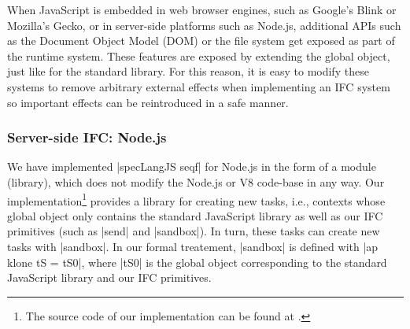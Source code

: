When JavaScript is embedded in web browser engines, such as Google's
Blink or Mozilla's Gecko, or in server-side platforms such as Node.js,
additional APIs such as the Document Object Model (DOM) or the file
system get exposed as part of the runtime system.
These features are exposed by extending the global object, just like
for the standard library.  For this reason, it is easy to modify
these systems to remove arbitrary external effects when implementing
an IFC system so important effects can be reintroduced in a safe manner.


\subsubsection{Server-side IFC: Node.js}

We have implemented |specLangJS seqf| for Node.js in the form of a module
(library), which does not modify the Node.js or V8 code-base in any
way.
%
Our implementation\footnote{The source code of our implementation can be found at
  \codelink{}.} provides a library for creating new tasks, i.e.,
contexts whose global object only contains the standard JavaScript
library as well as our IFC primitives (such as |send| and |sandbox|).
%
In turn, these tasks can create new tasks with |sandbox|.
%
In our formal treatement, |sandbox| is defined with |ap klone tS = tS0|,
where |tS0| is the global object corresponding to the standard
JavaScript library and our IFC primitives.

